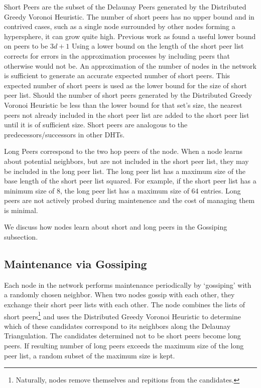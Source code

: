 \documentclass{IEEEtran}
\begin{document}
Short Peers are the subset of the Delaunay Peers generated by the Distributed Greedy Voronoi Heuristic. 
The number of short peers has no upper bound and in contrived cases, such as a single node surrounded by other nodes forming a hypersphere, it can grow quite high. Previous work as found a useful lower bound on peers to be $3d + 1$\cite{raynet}
Using a lower bound on the length of the short peer list corrects for errors in the approximation processes by including peers that otherwise would not be. 
An approximation of the number of nodes in the network is sufficient to generate an accurate expected number of short peers.  
This expected number of short peers is used as the lower bound for the size of short peer list.
Should the number of short peers generated by the Distributed Greedy Voronoi Heuristic be less than the lower bound for that set's size, the nearest peers not already included in the short peer list are added to the short peer list until it is of sufficient size.
Short peers are analogous to the predecessors/successors in other DHTs.

Long Peers correspond to the two hop peers of the node.
When a node learns about potential neighbors, but are not included in the short peer list, they may be included in the long peer list.  
The long peer list has a maximum size of the base length of the short peer list squared.  
For example, if the short peer list has a minimum size of 8, the long peer list has a maximum size of 64 entries.  
Long peers are not actively probed during maintenence and the cost of managing them is minimal.
 
We discuss how nodes learn about short and long peers in the Gossiping subsection.


\subsection{Maintenance via Gossiping}
Each node in the network performs maintenance periodically by `gossiping' with a randomly chosen neighbor.
When two nodes gossip with each other, they exchange their short peer lists with each other.
The node combines the lists of short peers\footnote{Naturally, nodes remove themselves and repitions from the candidates.} and uses the  Distributed Greedy Voronoi Heuristic to determine which of these candidates correspond to its neighbors along the Delaunay Triangulation.
The candidates determined not to be short peers become long peers.  
If resulting number of long peers exceeds the maximum size of the long peer list, a random subset of the maximum size is kept.
\end{document}
